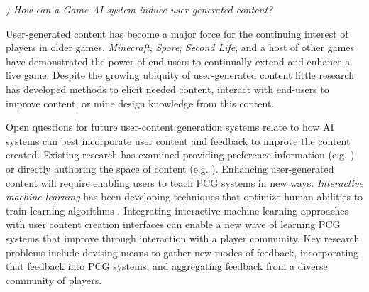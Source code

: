 \documentclass[conference]{IEEEtran}
\newcounter{questionno}
\newcommand{\subsubsectionx}[1]{{\em {\arabic{questionno}) #1}}
	\addtocounter{questionno}{1}
	}
\begin{document}


\subsubsectionx{How can a Game AI system induce user-generated content?}
%
User-generated content has become a major force for the continuing interest of players in older games.
{\em Minecraft}, {\em Spore}, {\em Second Life}, and a host of other games have demonstrated the power of end-users to continually extend and enhance a live game.
Despite the growing ubiquity of user-generated content little research has developed methods to elicit needed content, interact with end-users to improve content, or mine design knowledge from this content.

Open questions for future user-content generation systems relate to how AI systems can best incorporate user content and feedback to improve the content created. 
Existing research has examined providing preference information (e.g. \cite{hastings2009:gar, risi2012:petalz}) or directly authoring the space of content (e.g. \cite{smith2011:tanagra, smith2010:variations, dormans2009:machinations}). 
Enhancing user-generated content will require enabling users to teach PCG systems in new ways.
{\em Interactive machine learning} has been developing techniques that optimize human abilities to train learning algorithms \cite{amershi2011:interactive-ml-interaction}. 
Integrating interactive machine learning approaches with user content creation interfaces can enable a new wave of learning PCG systems that improve through interaction with a player community. 
Key research problems include devising means to gather new modes of feedback, incorporating that feedback into PCG systems, and aggregating feedback from a diverse community of players.
\end{document}
